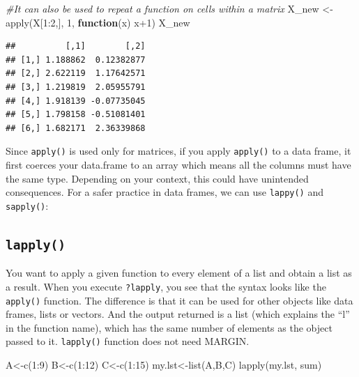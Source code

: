 \documentclass[
]{book}
\newenvironment{Shaded}{\begin{snugshade}}{\end{snugshade}}
\newcommand{\CommentTok}[1]{\textcolor[rgb]{0.56,0.35,0.01}{\textit{#1}}}
\newcommand{\ControlFlowTok}[1]{\textcolor[rgb]{0.13,0.29,0.53}{\textbf{#1}}}
\newcommand{\DecValTok}[1]{\textcolor[rgb]{0.00,0.00,0.81}{#1}}
\newcommand{\FunctionTok}[1]{\textcolor[rgb]{0.00,0.00,0.00}{#1}}
\newcommand{\NormalTok}[1]{#1}
\newcommand{\OtherTok}[1]{\textcolor[rgb]{0.56,0.35,0.01}{#1}}
\newcommand{\SpecialCharTok}[1]{\textcolor[rgb]{0.00,0.00,0.00}{#1}}
\begin{document}
\begin{Shaded}
\begin{Highlighting}[]
\CommentTok{\#It can also be used to repeat a function on cells within a matrix}
\NormalTok{X\_new }\OtherTok{\textless{}{-}} \FunctionTok{apply}\NormalTok{(X[}\DecValTok{1}\SpecialCharTok{:}\DecValTok{2}\NormalTok{,], }\DecValTok{1}\NormalTok{, }\ControlFlowTok{function}\NormalTok{(x) x}\SpecialCharTok{+}\DecValTok{1}\NormalTok{)}
\NormalTok{X\_new}
\end{Highlighting}
\end{Shaded}

\begin{verbatim}
##          [,1]        [,2]
## [1,] 1.188862  0.12382877
## [2,] 2.622119  1.17642571
## [3,] 1.219819  2.05955791
## [4,] 1.918139 -0.07735045
## [5,] 1.798158 -0.51081401
## [6,] 1.682171  2.36339868
\end{verbatim}

Since \texttt{apply()} is used only for matrices, if you apply \texttt{apply()} to a data frame, it first coerces your data.frame to an array which means all the columns must have the same type. Depending on your context, this could have unintended consequences. For a safer practice in data frames, we can use \texttt{lappy()} and \texttt{sapply()}:

\hypertarget{lapply}{%
\subsection{\texorpdfstring{\texttt{lapply()}}{lapply()}}\label{lapply}}

You want to apply a given function to every element of a list and obtain a list as a result. When you execute \texttt{?lapply}, you see that the syntax looks like the \texttt{apply()} function. The difference is that it can be used for other objects like data frames, lists or vectors. And the output returned is a list (which explains the ``l'' in the function name), which has the same number of elements as the object passed to it. \texttt{lapply()} function does not need MARGIN.

\begin{Shaded}
\begin{Highlighting}[]
\NormalTok{A}\OtherTok{\textless{}{-}}\FunctionTok{c}\NormalTok{(}\DecValTok{1}\SpecialCharTok{:}\DecValTok{9}\NormalTok{)}
\NormalTok{B}\OtherTok{\textless{}{-}}\FunctionTok{c}\NormalTok{(}\DecValTok{1}\SpecialCharTok{:}\DecValTok{12}\NormalTok{)}
\NormalTok{C}\OtherTok{\textless{}{-}}\FunctionTok{c}\NormalTok{(}\DecValTok{1}\SpecialCharTok{:}\DecValTok{15}\NormalTok{)}
\NormalTok{my.lst}\OtherTok{\textless{}{-}}\FunctionTok{list}\NormalTok{(A,B,C)}
\FunctionTok{lapply}\NormalTok{(my.lst, sum)}
\end{Highlighting}
\end{Shaded}
\end{document}
